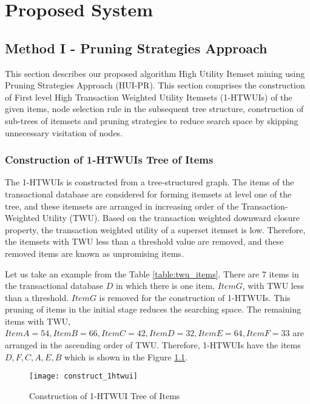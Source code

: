 \documentclass[11pt,openright]{report}
\begin{document}
\chapter{Proposed System} \label{chapter:proposed_system}

\section{Method I - Pruning Strategies Approach}
This section describes our proposed algorithm High Utility Itemset mining using Pruning Strategies Approach (HUI-PR). This section comprises the construction of First level High Transaction Weighted Utility Itemsets (1-HTWUIs) of the given items, node selection rule in the subsequent tree structure, construction of sub-trees of itemsets and pruning strategies to reduce search space by skipping unnecessary visitation of nodes.

\subsection{Construction of 1-HTWUIs Tree of Items} \label{ss:construct_1htuwis}
The 1-HTWUIs is constructed from a tree-structured graph. The items of the transactional database are considered for forming itemsets at level one of the tree, and these itemsets are arranged in increasing order of the Transaction-Weighted Utility (TWU). Based on the transaction weighted downward closure property\cite{Liu2005}, the transaction weighted utility of a superset itemset is low. Therefore, the itemsets with TWU less than a threshold value are removed, and these removed items are known as unpromising items.

Let us take an example from the Table \ref{table:twu_items}. There are 7 items in the transactional database $D$ in which there is one item, $Item G$, with TWU less than a threshold. $Item G$ is removed for the construction of 1-HTWUIs. This pruning of items in the initial stage reduces the searching space. The remaining items with TWU, $Item A = 54, Item B = 66, Item C = 42, Item D = 32, Item E = 64, Item F = 33$ are arranged in the ascending order of TWU. Therefore, 1-HTWUIs have the items $D, F, C, A, E, B$ which is shown in the Figure \ref{fig:tree_htwui}.

\begin{figure}
	\centering
	\texttt{[image: construct\_1htwui]}
	\caption{Construction of 1-HTWUI Tree of Items}
	\label{fig:tree_htwui}
\end{figure}
\end{document}
